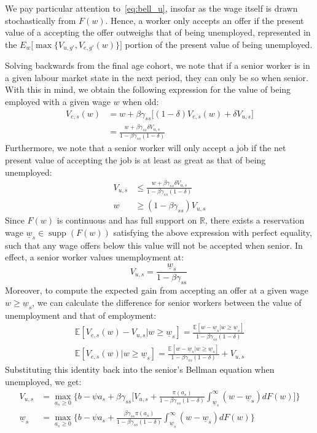 \documentclass{article}
\newcommand{\lbar}[1]{\underline{#1}} %
\DeclareMathOperator\supp{supp} %
\begin{document}
We pay particular attention to~\eqref{eq:bell_u}, insofar as the wage itself is drawn stochastically from $F(w)$. Hence, a worker only accepts an offer if the present value of a accepting the offer outweighs that of being unemployed, represented in the ${E}_w \bigl[\max\{V_{u,g'}, V_{e,g'}(w)\}\bigr]$ portion of the present value of being unemployed.

Solving backwards from the final age cohort, we note that if a senior worker is in a given labour market state in the next period, they can only be so when senior. With this in mind, we obtain the following expression for the value of being 
employed with a given wage $w$ when old:
\begin{align*}
V_{e,s}(w)&=w+\beta\gamma_{ss}\bigl[(1-\delta)V_{e,s}(w)+\delta V_{u,s}\bigr]\\
&=\frac{w+\beta\gamma_{ss}\delta V_{u,s}}{1-\beta\gamma_{ss}(1-\delta)}
\end{align*}
Furthermore, we note that a senior worker will only accept a job if the net present value of accepting the job is at least as great as that of being unemployed:
\begin{align*}
V_{u,s}&\leq\frac{w+\beta\gamma_{ss}\delta V_{u,s}}{1-\beta\gamma_{ss}(1-\delta)}\\
w&\geq(1-\beta\gamma_{ss})V_{u,s}
\end{align*}
Since $F(w)$ is continuous and has full support on $\mathbb{R}$, there exists a reservation wage $\lbar{w}_s\in\supp(F(w))$ satisfying the above expression with perfect equality, such that any wage offers below this value will not be accepted when senior. In effect, a senior worker values unemployment at:
\begin{equation}
V_{u,s}=\frac{\lbar{w}_s}{1-\beta\gamma_{ss}}
~\label{eq:sen_res_unemp}
\end{equation}
Moreover, to compute the expected gain from accepting an offer at a given wage $w\geq\lbar{w}_s$, we can calculate the difference for senior workers between the value of unemployment and that of employment:
\begin{align*}
\mathbb{E}[V_{e,s}(w)-V_{u,s}|w\geq\lbar{w}_s]=\frac{\mathbb{E}[w-\lbar{w}_s|w\geq\lbar{w}_s]}{1-\beta\gamma_{ss}(1-\delta)}\\
\mathbb{E}[V_{e,s}(w)|w\geq\lbar{w}_s]=\frac{\mathbb{E}[w-\lbar{w}_s|w\geq\lbar{w}_s]}{1-\beta\gamma_{ss}(1-\delta)}+V_{u,s}
\end{align*}
Substituting this identity back into the senior's Bellman equation when unemployed, we get:
\begin{align*}
V_{u,s}&=\max_{a_s\geq 0}\Biggl\{b-\psi a_s+\beta\gamma_{ss}\biggl[V_{u,s}+\frac{\pi(a_s)}{1-\beta\gamma_{ss}(1-\delta)}\int_{\lbar{w}_s}^\infty(w-\lbar{w}_s)dF(w)\biggr]\Biggr\}\\
\lbar{w}_s&=\max_{a_s\geq 0}\Biggl\{b-\psi a_s+\frac{\beta\gamma_{ss}\pi(a_s)}{1-\beta\gamma_{ss}(1-\delta)}\int_{\lbar{w}_s}^\infty(w-\lbar{w}_s)dF(w)\Biggr\}\\
\end{align*}
\end{document}

